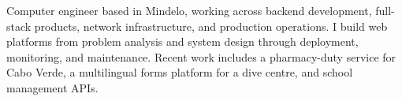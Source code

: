 
\begin{cvparagraph}
Computer engineer based in Mindelo, working across backend development, full-stack products, network infrastructure, and production operations. I build web platforms from problem analysis and system design through deployment, monitoring, and maintenance. Recent work includes a pharmacy-duty service for Cabo Verde, a multilingual forms platform for a dive centre, and school management APIs.
\end{cvparagraph}
